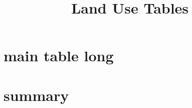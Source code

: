 \documentclass{article}
\title{Land Use Tables}
\begin{document}
\maketitle
\tableofcontents
{\footnotesize 
\listoffigures
\listoftables}
\clearpage

\section{main table long}

\clearpage
\section{summary}

\begin{table}[htbp]
\footnotesize
\centering {} 

 \label{tab:muni_outcomes_rf}
 \end{table}
\end{document}
